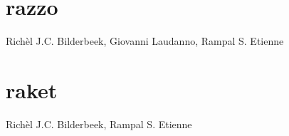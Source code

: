 \documentclass[]{dissertation}
\begin{document}
\chapter{razzo}
\label{chapter_razzo}
Rich\`el J.C. Bilderbeek, Giovanni Laudanno, Rampal S. Etienne
\newpage

%

\chapter{raket}
\label{chapter_raket}
Rich\`el J.C. Bilderbeek, Rampal S. Etienne
\newpage




%

% 




\appendix

%

\thumbfalse



% 
\end{document}
